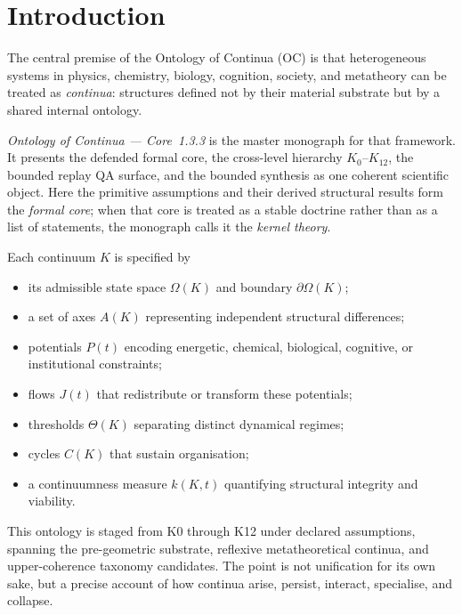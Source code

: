 
\section{Introduction}
\label{sec:intro}

The central premise of the Ontology of Continua (OC) is that heterogeneous
systems in physics, chemistry, biology, cognition, society, and metatheory can
be treated as \emph{continua}: structures defined
not by their material substrate but by a shared internal ontology.

\emph{Ontology of Continua --- Core~1.3.3} is the master monograph for that
framework. It presents the defended formal core, the cross-level hierarchy
\(K_0\)–\(K_{12}\), the bounded replay QA surface, and the bounded synthesis as one coherent scientific object.
Here the primitive assumptions and their derived structural results form the
\emph{formal core}; when that core is treated as a stable doctrine rather than
as a list of statements, the monograph calls it the \emph{kernel theory}.

Each continuum \(K\) is specified by

\begin{itemize}
    \item its admissible state space \(\Omega(K)\) and boundary \(\partial\Omega(K)\);
    \item a set of axes \(A(K)\) representing independent structural differences;
    \item potentials \(P(t)\) encoding energetic, chemical, biological, cognitive, or institutional constraints;
    \item flows \(J(t)\) that redistribute or transform these potentials;
    \item thresholds \(\Theta(K)\) separating distinct dynamical regimes;
    \item cycles \(C(K)\) that sustain organisation;
    \item a continuumness measure \(k(K,t)\) quantifying structural integrity and viability.
\end{itemize}

This ontology is staged from K0 through K12 under declared assumptions, spanning the
pre-geometric substrate, reflexive metatheoretical continua, and
upper-coherence taxonomy candidates. The point is
not unification for its own sake, but a precise account of how continua arise,
persist, interact, specialise, and collapse.

